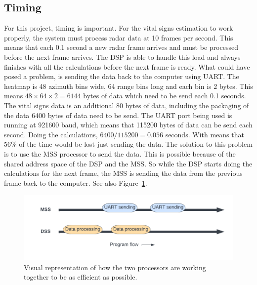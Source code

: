 \subsection{Timing}
For this project, timing is important. For the vital signs estimation to work properly, the system must process radar data at 10 frames per second. This means that each 0.1 second a new radar frame arrives and must be processed before the next frame arrives. The DSP is able to handle this load and always finishes with all the calculations before the next frame is ready. What could have posed a problem, is sending the data back to the computer using UART. The heatmap is 48 azimuth bins wide, 64 range bins long and each bin is 2 bytes. This means $48 \times 64 \times 2 = 6144$ bytes of data which need to be send each 0.1 seconds. The vital signs data is an additional 80 bytes of data, including the packaging of the data 6400 bytes of data need to be send. The UART port being used is running at 921600 baud, which means that 115200 bytes of data can be send each second. Doing the calculations, $6400 / 115200 = 0.056$ seconds. With means that 56\% of the time would be lost just sending the data. The solution to this problem is to use the MSS processor to send the data. This is possible because of the shared address space of the DSP and the MSS. So while the DSP starts doing the calculations for the next frame, the MSS is sending the data from the previous frame back to the computer. See also Figure~\ref{fig:uart_timing}.

\begin{figure}[t]
\centering
\includegraphics[width=.95\textwidth]{figures/realtime_implementation/timing_diagram.pdf}
\caption{Visual representation of how the two processors are working together to be as efficient as possible.}
\label{fig:uart_timing}
\end{figure}

